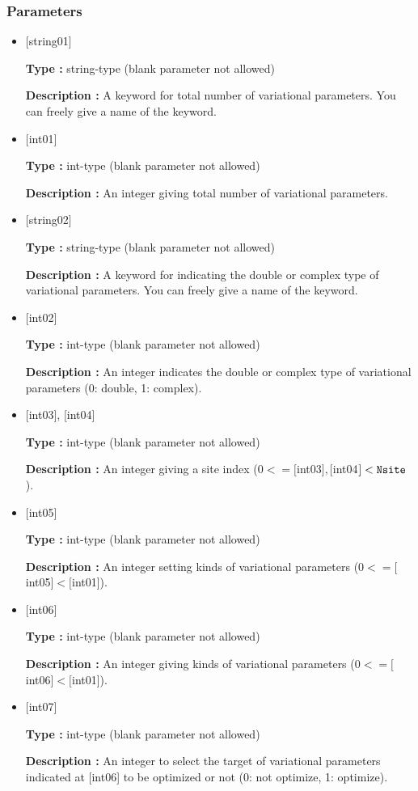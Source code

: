 \subsubsection{Parameters}
 \begin{itemize}

   \item  $[$string01$]$
   
    {\bf Type :} string-type (blank parameter not allowed)

   {\bf Description :}  A keyword for total number of variational parameters. You can freely give a name of the keyword. 

   \item  $[$int01$]$
   
    {\bf Type :} int-type (blank parameter not allowed)

   {\bf Description :} An integer giving total number of variational parameters. 

   \item  $[$string02$]$
   
    {\bf Type :} string-type (blank parameter not allowed)

   {\bf Description :} A keyword for indicating the double or complex type of variational parameters. You can freely give a name of the keyword.
   
   \item  $[$int02$]$
   
    {\bf Type :} int-type (blank parameter not allowed)

   {\bf Description :} An integer indicates the double or complex type of variational parameters (0: double, 1: complex). 

  \item  $[$int03$]$, $[$int04$]$
   
 {\bf Type :} int-type (blank parameter not allowed)

{\bf Description :} An integer giving a site index ($0<= [$int03$], [$int04$] <\verb|Nsite|$).
 
 \item  $[$int05$]$
   
   {\bf Type :} int-type (blank parameter not allowed)

  {\bf Description :} An integer setting kinds of variational  parameters ($0<= [$int05$]<[$int01]). 

 \item  $[$int06$]$
   
   {\bf Type :} int-type (blank parameter not allowed)

  {\bf Description :} An integer giving kinds of variational  parameters ($0<= [$int06$]<[$int01]).   
 \item  $[$int07$]$
   
   {\bf Type :} int-type (blank parameter not allowed)

  {\bf Description :} An integer to select the target of variational parameters indicated at [int06] to be optimized or not (0: not optimize, 1: optimize).
  
  
\end{itemize}

